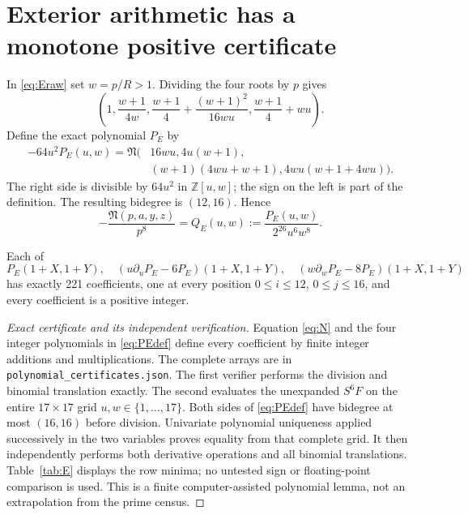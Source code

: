

\section{Exterior arithmetic has a monotone positive certificate}
In \eqref{eq:Eraw} set $w=p/R>1$. Dividing the four roots by $p$ gives
\[
 \left(1,\frac{w+1}{4w},
 \frac{w+1}{4}+\frac{(w+1)^2}{16wu},\frac{w+1}{4}+wu\right).
\]
Define the exact polynomial $P_E$ by
\begin{equation}\label{eq:PEdef}
 \begin{split}
 -64u^2P_E(u,w)=\mathfrak N\bigl(&16wu,4u(w+1),\\
 &(w+1)(4wu+w+1),4wu(w+1+4wu)\bigr).
 \end{split}
\end{equation}
The right side is divisible by $64u^2$ in $\mathbb Z[u,w]$; the sign on the
left is part of the definition. The resulting bidegree is $(12,16)$. Hence
\begin{equation}\label{eq:QE}
 -\frac{\mathfrak N(p,a,y,z)}{p^8}
 =Q_E(u,w):=\frac{P_E(u,w)}{2^{26}u^6w^8}.
\end{equation}

\begin{lemma}\label{lem:Epoly}
Each of
\[
 P_E(1+X,1+Y),\quad
 (u\partial_uP_E-6P_E)(1+X,1+Y),\quad
 (w\partial_wP_E-8P_E)(1+X,1+Y)
\]
has exactly 221 coefficients, one at every position
$0\le i\le12$, $0\le j\le16$, and every coefficient is a positive integer.
\end{lemma}
\begin{proof}[Exact certificate and its independent verification]
Equation \eqref{eq:N} and the four integer polynomials in \eqref{eq:PEdef}
define every coefficient by finite integer additions and multiplications.
The complete arrays are in \texttt{polynomial\_certificates.json}.
The first verifier performs the division and binomial translation exactly.
The second evaluates the unexpanded $S^6F$ on the entire $17\times17$ grid
$u,w\in\{1,\ldots,17\}$. Both sides of \eqref{eq:PEdef} have bidegree at
most $(16,16)$ before division. Univariate polynomial uniqueness applied
successively in the two variables proves equality from that complete grid.
It then independently performs both derivative operations and all binomial
translations. Table~\ref{tab:E} displays the row minima; no untested sign or
floating-point comparison is used. This is a finite computer-assisted
polynomial lemma, not an extrapolation from the prime census.
\end{proof}

